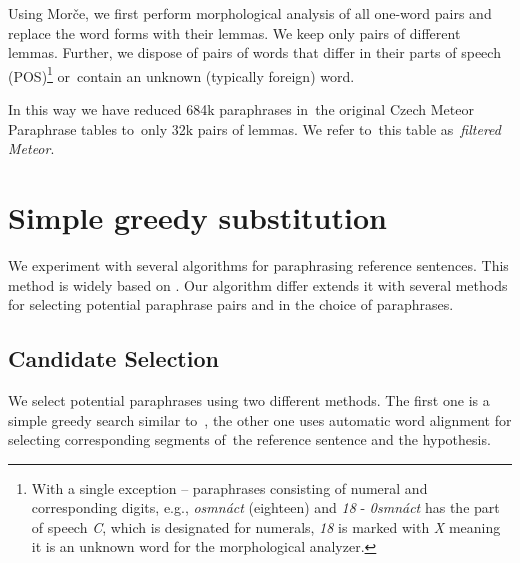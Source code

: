 \documentclass[11pt]{article}
\begin{document}
Using Morče, we first perform morphological analysis of all one-word pairs and replace 
the word forms with their lemmas.  We keep only pairs of different lemmas. Further, we
dispose of pairs of words that differ in their parts of speech (POS)\footnote{With a single 
exception -- paraphrases consisting of numeral and corresponding digits, e.g., \textit{osmnáct} 
(eighteen) and \textit{18} - \textit{0smnáct} has the part of speech \textit{C}, which is 
designated for numerals, \textit{18} is marked with \textit{X} meaning it is an unknown word 
for the morphological analyzer.} or~contain an unknown (typically foreign) word.

In this way we have reduced 684k paraphrases in~the original Czech Meteor Paraphrase tables 
to~only 32k pairs of lemmas. We refer to~this table as~\textit{filtered Meteor}.

\section{Simple greedy substitution}
\label{lrec}
We experiment with several algorithms for paraphrasing reference sentences. This method is
widely based on \cite{kauchak}. Our algorithm differ extends it with several methods for 
selecting potential paraphrase pairs and in the choice of paraphrases.

\subsection{Candidate Selection}
We select potential paraphrases using two different methods. The first one is a simple 
greedy search similar to~, the other one uses automatic word alignment 
for selecting corresponding segments of~the reference sentence and the hypothesis.
\end{document}
